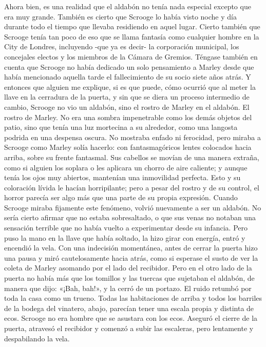 \documentclass{novela}
\begin{document}
 Ahora bien, es una realidad que el aldabón no tenía nada especial excepto que era muy grande. También es cierto que Scrooge lo había visto noche y día durante todo el tiempo que llevaba residiendo en aquel lugar. Cierto también que Scrooge tenía tan poco de eso que se llama fantasía como cualquier hombre en la City de Londres, incluyendo -que ya es decir- la corporación municipal, los concejales electos y los miembros de la Cámara de Gremios. Téngase también en cuenta que Scrooge no había dedicado un solo pensamiento a Marley desde que había mencionado aquella tarde el fallecimiento de su socio siete años atrás. Y entonces que alguien me explique, si es que puede, cómo ocurrió que al meter la llave en la cerradura de la puerta, y sin que se diera un proceso intermedio de cambio, Scrooge no vio un aldabón, sino el rostro de Marley en el aldabón.
 El rostro de Marley. No era una sombra impenetrable como los demás objetos del patio, sino que tenía una luz mortecina a su alrededor, como una langosta podrida en una despensa oscura. No mostraba enfado ni ferocidad, pero miraba a Scrooge como Marley solía hacerlo: con fantasmagóricos lentes colocados hacia arriba, sobre su frente fantasmal. Sus cabellos se movían de una manera extraña, como si alguien los soplara o les aplicara un chorro de aire caliente; y aunque tenía los ojos muy abiertos, mantenían una inmovilidad perfecta. Esto y su coloración lívida le hacían horripilante; pero a pesar del rostro y de su control, el horror parecía ser algo más que una parte de su propia expresión.
 Cuando Scrooge miraba fijamente este fenómeno, volvió nuevamente a ser un aldabón.
 No sería cierto afirmar que no estaba sobresaltado, o que sus venas no notaban una sensación terrible que no había vuelto a experimentar desde su infancia. Pero puso la mano en la llave que había soltado, la hizo girar con energía, entró y encendió la vela.
 Con una indecisión momentánea, antes de cerrar la puerta hizo una pausa y miró cautelosamente hacia atrás, como si esperase el susto de ver la coleta de Marley asomando por el lado del recibidor. Pero en el otro lado de la puerta no había más que los tomillos y las tuercas que sujetaban el aldabón, de manera que dijo: «¡Bah, bah!», y la cerró de un portazo.
 El ruido retumbó por toda la casa como un trueno. Todas las habitaciones de arriba y todos los barriles de la bodega del vinatero, abajo, parecían tener una escala propia y distinta de ecos. Scrooge no era hombre que se asustara con los ecos. Aseguró el cierre de la puerta, atravesó el recibidor y comenzó a subir las escaleras, pero lentamente y despabilando la vela.
\end{document}
